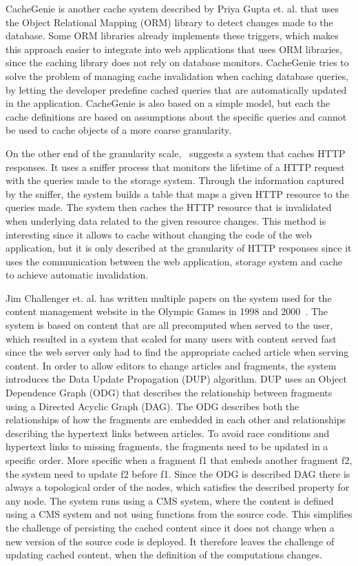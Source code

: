 CacheGenie is another cache system described by Priya Gupta et. al. that uses the Object Relational Mapping (ORM) library to detect changes made to the database. Some ORM libraries already implements these triggers, which makes this approach easier to integrate into web applications that uses ORM libraries, since the caching library does not rely on database monitors. CacheGenie tries to solve the problem of managing cache invalidation when caching database queries, by letting the developer predefine cached queries that are automatically updated in the application. CacheGenie is also based on a simple model, but each the cache definitions are based on assumptions about the specific queries and cannot be used to cache objects of a more coarse granularity.

On the other end of the granularity scale,~\cite{paper:db-driven-http} suggests a system that caches HTTP responses. It uses a sniffer process that monitors the lifetime of a HTTP request with the queries made to the storage system. Through the information captured by the sniffer, the system builds a table that maps a given HTTP resource to the queries made. The system then caches the HTTP resource that is invalidated when underlying data related to the given resource changes. This method is interesting since it allows to cache without changing the code of the web application, but it is only described at the granularity of HTTP responses since it uses the communication between the web application, storage system and cache to achieve automatic invalidation.

Jim Challenger et. al. has written multiple papers on the system used for the content management website in the Olympic Games in 1998 and 2000~\cite{paper:ibm, paper:ibm-extended}. The system is based on content that are all precomputed when served to the user, which resulted in a system that scaled for many users with content served fast since the web server only had to find the appropriate cached article when serving content. In order to allow editors to change articles and fragments, the system introduces the Data Update Propagation (DUP) algorithm. DUP uses an Object Dependence Graph (ODG) that describes the relationship between fragments using a Directed Acyclic Graph (DAG). The ODG describes both the relationships of how the fragments are embedded in each other and relationships describing the hypertext links between articles. To avoid race conditions and hypertext links to missing fragments, the fragments need to be updated in a specific order. More specific when a fragment f1 that embeds another fragment f2, the system need to update f2 before f1. Since the ODG is described DAG there is always a topological order of the nodes, which satisfies the described property for any node. The system runs using a CMS system, where the content is defined using a CMS system and not using functions from the source code. This simplifies the challenge of persisting the cached content since it does not change when a new version of the source code is deployed. It therefore leaves the challenge of updating cached content, when the definition of the computations changes.

